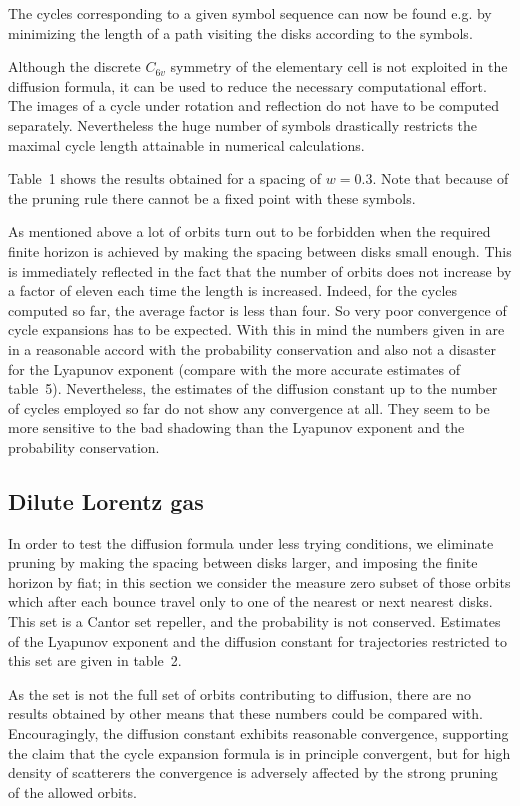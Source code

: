 The cycles corresponding to a given symbol sequence can now be found e.g.
by minimizing the length of a path visiting the disks according to the
symbols.

Although the discrete $C_{6v}$
symmetry of the elementary cell is not exploited in the
diffusion formula, it can be used to reduce the necessary computational effort.
The images of a cycle under rotation and reflection do not have to be computed
separately. Nevertheless the huge number of symbols drastically restricts the
maximal cycle length attainable in numerical calculations.

Table~1 shows the results obtained for a spacing of $w=0.3$.
Note that because of the pruning rule there cannot be a fixed point with
these symbols.

As mentioned above a lot of orbits turn out to be forbidden when
the required finite horizon is achieved by making the spacing between disks
small enough. This is immediately reflected in the fact that the number of
orbits does not increase by a factor of eleven each time the length is
increased. Indeed, for the cycles computed so far,
the average factor is less than four. So very poor
convergence of cycle expansions has to be expected. With this in mind the
numbers given in  %
are in a reasonable
accord with the probability conservation
and also not a disaster for the Lyapunov exponent (compare with the
more accurate estimates of table~5).
Nevertheless, the estimates of the diffusion constant
up to the number of cycles employed so far do not show any convergence
at all. They seem to be more sensitive to the bad shadowing than the Lyapunov
exponent and the probability conservation.

\subsection{Dilute Lorentz gas}
In order to test the diffusion formula under less trying conditions,
we eliminate pruning by making the spacing between disks larger,
and imposing the finite horizon by fiat; in this section
we consider the measure zero subset of those orbits
which after each bounce travel only to one
of the nearest or next nearest disks. This set is a Cantor set
repeller, and the probability is not conserved. Estimates of the
Lyapunov exponent and the diffusion constant for trajectories
restricted to this set are given in table~2.

As the set is not the full set of orbits contributing to
diffusion, there are no results obtained by other means that
these numbers could be compared with.
Encouragingly, the diffusion constant exhibits reasonable
convergence, supporting the claim that the cycle expansion
formula is in principle convergent, but for high
density of scatterers the convergence is adversely
affected by the strong pruning of the allowed orbits.

